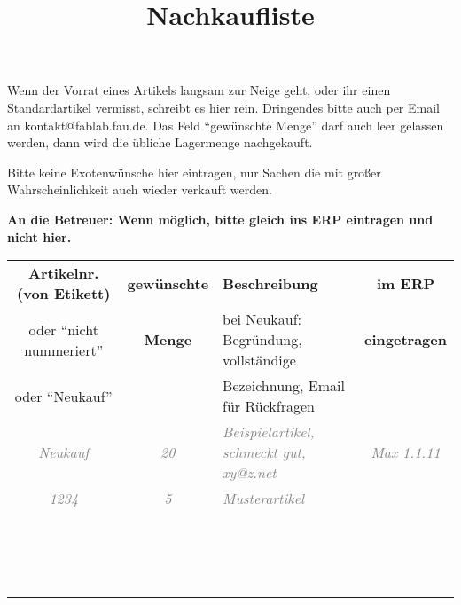 \documentclass{\basedir/fablab-document}
\date{}
\author{}
\title{Nachkaufliste}
\newcommand{\thickhline}{\noalign{\hrule height 2pt}}
\begin{document}
Wenn der Vorrat eines Artikels langsam zur Neige geht, oder ihr einen Standardartikel vermisst, schreibt es hier rein. Dringendes bitte auch per Email an kontakt@fablab.fau.de. Das Feld \enquote{gewünschte Menge} darf auch leer gelassen werden, dann wird die übliche Lagermenge nachgekauft.

Bitte keine Exotenwünsche hier eintragen, nur Sachen die mit großer Wahrscheinlichkeit auch wieder verkauft werden. 

\textbf{An die Betreuer: Wenn möglich, bitte gleich ins ERP eintragen und nicht hier.}

\newcommand{\bsp}[1]{\textcolor{gray}{\itshape #1}}
\newcommand{\beispielzeile}[4]{\bsp{#1} & \bsp{#2} & \bsp{#3} & \bsp{#4}  \\}
\newcommand{\leerzeile}{\vbox{\vspace{2.5em}} & & & \\ \hline}
\begin{tabularx}{\textwidth}{|c|c|X|c|} \hline
\bfseries Artikelnr. (von Etikett)         &  \bfseries gewünschte  & \bfseries Beschreibung & \bfseries im ERP \\

oder \enquote{nicht nummeriert}  &  \bfseries Menge       & bei Neukauf: Begründung, vollständige    & \bfseries eingetragen \\
oder \enquote{Neukauf} & &  Bezeichnung, Email für Rückfragen & \\ \thickhline
\beispielzeile{Neukauf}{20}{Beispielartikel, schmeckt gut, xy@z.net}{Max 1.1.11} \hline
\beispielzeile{1234}{5}{Musterartikel}{} \hline
\leerzeile
\leerzeile
\leerzeile
\leerzeile
\leerzeile
\leerzeile
\leerzeile
\leerzeile
\leerzeile
\leerzeile
\leerzeile
\leerzeile
\leerzeile
\leerzeile
\leerzeile
\leerzeile
\end{tabularx}
\end{document}
